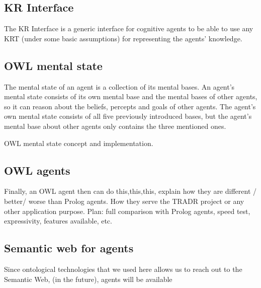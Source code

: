 \subsection{KR Interface}

The KR Interface is a generic interface for cognitive agents to be able to use any KRT (under some basic assumptions) for representing the agents' knowledge. 


\subsection{OWL mental state}

The mental state of an agent is a collection of its mental bases. An agent's mental state consists of its own mental base and the mental bases of other agents, so it can reason about the beliefs, percepts and goals of other agents. The agent's own mental state consists of all five previously introduced bases, but the agent's mental base about other agents only contains the three mentioned ones. 

OWL mental state concept and implementation.

\subsection{OWL agents}

Finally, an OWL agent then can do this,this,this, explain how they are different / better/ worse than Prolog agents. How they serve the TRADR project or any other application purpose. 
Plan: full comparison with Prolog agents, speed test, expressivity, features available, etc.

\subsection{Semantic web for agents}

Since ontological technologies that we used here allows us to reach out to the Semantic Web,
(in the future), agents will be available 


  
  
  
  
  
  
  
  
  
  